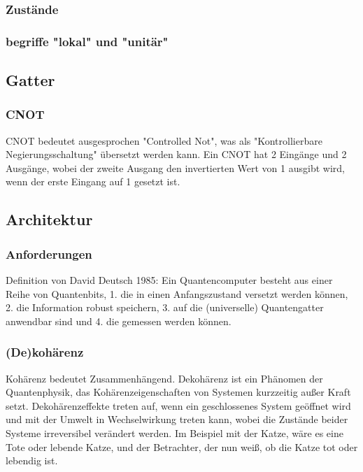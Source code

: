 \subsubsection{Zust\"ande}

\subsubsection{begriffe "lokal" und "unit\"ar"}

\subsection{Gatter}
\label{sec:Gatter}

\subsubsection{CNOT}

CNOT bedeutet ausgesprochen "Controlled Not", was als "Kontrollierbare Negierungsschaltung" übersetzt werden kann.
Ein CNOT hat 2 Eingänge und 2 Ausgänge, wobei der zweite Ausgang den invertierten Wert von 1 ausgibt wird, wenn der erste Eingang auf 1 gesetzt ist.

\subsection{Architektur}
\label{sec:Architektur}

\subsubsection{Anforderungen}

Definition von David Deutsch 1985:
Ein Quantencomputer besteht aus einer Reihe von Quantenbits,
1. die in einen Anfangszustand versetzt werden k\"onnen,
2. die Information robust speichern,
3. auf die (universelle) Quantengatter anwendbar sind und
4. die gemessen werden k\"onnen.

\subsubsection{(De)koh\"arenz}

Kohärenz bedeutet Zusammenhängend. Dekohärenz ist ein Phänomen der Quantenphysik, das Kohärenzeigenschaften von Systemen kurzzeitig außer Kraft setzt. Dekohärenzeffekte treten auf, wenn ein geschlossenes System geöffnet wird und mit der Umwelt in Wechselwirkung treten kann, wobei die Zustände beider Systeme irreversibel verändert werden.
Im Beispiel mit der Katze, wäre es eine Tote oder lebende Katze, und der Betrachter, der nun weiß, ob die Katze tot oder lebendig ist.

